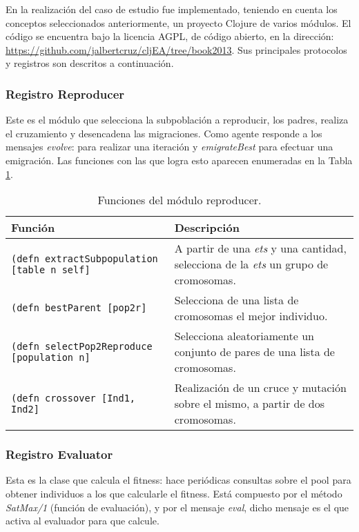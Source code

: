 En la realización del caso de estudio fue implementado, teniendo en cuenta los conceptos seleccionados anteriormente, un proyecto Clojure de varios módulos. El código se encuentra bajo la licencia AGPL, de código abierto, en la dirección: \url{https://github.com/jalbertcruz/cljEA/tree/book2013}. Sus principales protocolos y registros son descritos a continuación.


\subsubsection{Registro Reproducer}

Este es el módulo que selecciona la subpoblación a reproducir, los padres, realiza el cruzamiento y desencadena las migraciones. Como agente responde a los mensajes {\em evolve}: para realizar una iteración y {\em emigrateBest} para efectuar una emigración. Las funciones con las que logra esto aparecen enumeradas en la Tabla \ref{tb:clj:reproducer}.

\begin{table}
  \caption{Funciones del módulo reproducer.}\label{tb:clj:reproducer}
  \centering
\begin{tabular}{|p{5cm}|p{7cm}|}
  \hline
   \textbf{Función} &  \textbf{Descripción} \\
  \hline
  {\tt (defn extractSubpopulation [table n self] } & A partir de una {\em ets} y una cantidad, selecciona de la {\em ets} un grupo de cromosomas. \\
  \hline
  {\tt (defn bestParent [pop2r]} & Selecciona de una lista de cromosomas el mejor individuo. \\
  \hline
 {\tt (defn selectPop2Reproduce [population n]} & Selecciona aleatoriamente un conjunto de pares de una lista de cromosomas. \\
  \hline
  {\tt (defn crossover [Ind1, Ind2]} & Realización de un cruce y mutación sobre el mismo, a partir de dos cromosomas. \\
  \hline
\end{tabular}
\end{table}


\subsubsection{Registro Evaluator}

Esta es la clase que calcula el fitness: hace periódicas consultas sobre el pool para obtener individuos a los que calcularle el fitness. Está compuesto por el método {\em SatMax/1} (función de evaluación), y por el mensaje {\em eval}, dicho mensaje es el que activa al evaluador para que calcule.

